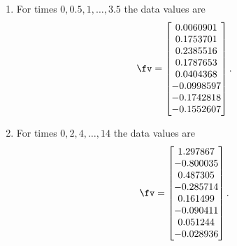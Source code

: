 \begin{exercise}
\begin{enumerate}
\item  For times \(0,0.5,1,\ldots,3.5\) the data values are 
\setbox\ajrqrbox\hbox{}\marginpar{\usebox{\ajrqrbox}}%
\[ \fv=\begin{bmatrix} 0.0060901
\\  0.1753701
\\  0.2385516
\\  0.1787653
\\  0.0404368
\\ -0.0998597
\\ -0.1742818
\\ -0.1552607 \end{bmatrix}.\]
  
\item  For times \(0,2,4,\ldots,14\) the data values are 
\setbox\ajrqrbox\hbox{}\marginpar{\usebox{\ajrqrbox}}%
\[ \fv=\begin{bmatrix} 1.297867
\\ -0.800035
\\  0.487305
\\ -0.285714
\\  0.161499
\\ -0.090411
\\  0.051244
\\ -0.028936 \end{bmatrix}.\]
  
\end{enumerate}
\end{exercise}




